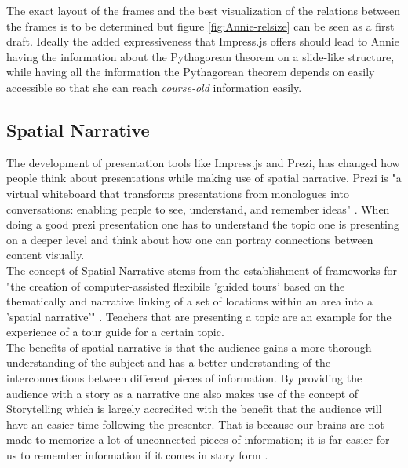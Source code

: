 \documentclass[twoside, 12pt]{article}
\begin{document}
The exact layout of the frames and the best visualization of the relations between the frames is to be determined but figure \ref{fig:Annie-relsize} can be seen as a first draft. Ideally the added expressiveness that Impress.js offers should lead to Annie having the information about the Pythagorean theorem on a slide-like structure, while having all the information the Pythagorean theorem depends on easily accessible so that she can reach \textit{course-old} information easily. \\

\subsection{Spatial Narrative}
\label{sec:spatialnarrative}

The development of presentation tools like Impress.js and Prezi, has changed how people think about presentations while making use of spatial narrative. Prezi is "a virtual whiteboard that transforms presentations from monologues into conversations: enabling people to see, understand, and remember ideas" \cite{Prezi:npentrel14}. When doing a good prezi presentation one has to understand the topic one is presenting on a deeper level and think about how one can portray connections between content visually.\\

The concept of Spatial Narrative stems from the establishment of frameworks for "the creation of computer-assisted flexibile 'guided tours' based on the thematically and narrative linking of a set of locations within an area into a 'spatial narrative'" \cite{SpatialNarratives:npentrel14}. Teachers that are presenting a topic are an example for the experience of a tour guide for a certain topic.\\

The benefits of spatial narrative is that the audience gains a more thorough understanding of the subject and has a better understanding of the interconnections between different pieces of information. By providing the audience with a story as a narrative one also makes use of the concept of Storytelling which is largely accredited with the benefit that the audience will have an easier time following the presenter. That is because our brains are not made to memorize a lot of unconnected pieces of information; it is far easier for us to remember information if it comes in story form \cite{Storytelling:npentrel14}.\\
\end{document}
